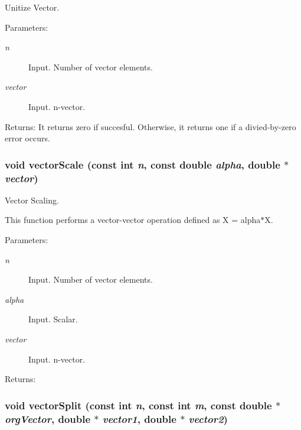 Unitize Vector. 

\begin{Desc}
\item[Parameters:]
\begin{description}
\item[{\em n}]Input. Number of vector elements. \item[{\em vector}]Input. n-vector.\end{description}
\end{Desc}
\begin{Desc}
\item[Returns:]It returns zero if succesful. Otherwise, it returns one if a divied-by-zero error occurs. \end{Desc}
\hypertarget{group__a_g97fc3b2e8bbe3973ac8fe0c122807b89}{
\subsubsection[vectorScale]{\setlength{\rightskip}{0pt plus 5cm}void vectorScale (const int {\em n}, \/  const double {\em alpha}, \/  double $\ast$ {\em vector})}}
\label{group__a_g97fc3b2e8bbe3973ac8fe0c122807b89}


Vector Scaling. 

This function performs a vector-vector operation defined as X = alpha$\ast$X.

\begin{Desc}
\item[Parameters:]
\begin{description}
\item[{\em n}]Input. Number of vector elements. \item[{\em alpha}]Input. Scalar. \item[{\em vector}]Input. n-vector.\end{description}
\end{Desc}
\begin{Desc}
\item[Returns:]\end{Desc}
\hypertarget{group__a_g04a15ca8e56a12b927b5408ce191795a}{
\subsubsection[vectorSplit]{\setlength{\rightskip}{0pt plus 5cm}void vectorSplit (const int {\em n}, \/  const int {\em m}, \/  const double $\ast$ {\em orgVector}, \/  double $\ast$ {\em vector1}, \/  double $\ast$ {\em vector2})}}
\label{group__a_g04a15ca8e56a12b927b5408ce191795a}


